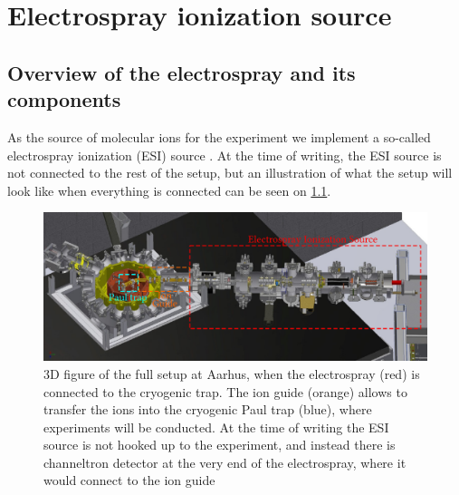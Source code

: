 \chapter{Electrospray ionization source}
\label{chap:ESI}

\section{Overview of the electrospray and its components}
As the source of molecular ions for the experiment we implement a so-called electrospray ionization (ESI) source \cite{FennEsi,Kjaer2021-lm}. At the time of writing, the ESI source is not connected to the rest of the setup, but an illustration of what the setup will look like when everything is connected can be seen on \cref{fig:fullSetup}.
\begin{figure}
    \centering
    \includegraphics[width = 1.1\textwidth]{main/spray.pdf}
    \caption{3D figure of the full setup at Aarhus, when the electrospray (red) is connected to the cryogenic trap. The ion guide (orange) allows to transfer the ions into the cryogenic Paul trap (blue), where experiments will be conducted. At the time of writing the ESI source is not hooked up to the experiment, and instead there is channeltron detector at the very end of the electrospray, where it would connect to the ion guide}
    \label{fig:fullSetup}
\end{figure}


